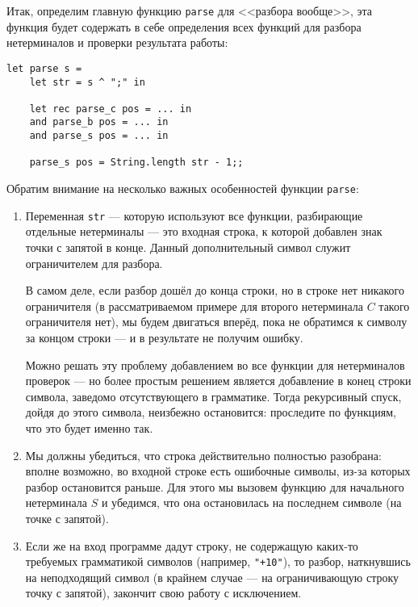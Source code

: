 \documentclass[12pt]{article}
\begin{document}
Итак, определим главную функцию \verb!parse! для <<разбора вообще>>, эта функция будет содержать 
в себе определения всех функций для разбора нетерминалов и проверки результата работы:

\begin{verbatim}
let parse s =
    let str = s ^ ";" in

    let rec parse_c pos = ... in
    and parse_b pos = ... in
    and parse_s pos = ... in

    parse_s pos = String.length str - 1;;
\end{verbatim}

Обратим внимание на несколько важных особенностей функции \verb!parse!:
\begin{enumerate}
\item Переменная \verb!str! --- которую используют все функции, разбирающие
отдельные нетерминалы --- это входная строка, к которой добавлен знак точки с
запятой в конце. Данный дополнительный символ служит ограничителем для разбора.

В самом деле, если разбор дошёл до конца строки, но в строке нет никакого ограничителя
(в рассматриваемом примере для второго нетерминала $C$ такого ограничителя нет), 
мы будем двигаться вперёд, пока не обратимся к символу за концом строки --- 
и в результате не получим ошибку.

Можно решать эту проблему добавлением во все функции для нетерминалов проверок 
--- но более простым решением является добавление в конец строки символа, заведомо
отсутствующего в грамматике. Тогда рекурсивный спуск, дойдя до этого символа,
неизбежно остановится: проследите по функциям, что это будет именно так.

\item Мы должны убедиться, что строка действительно полностью разобрана: вполне
возможно, во входной строке есть ошибочные символы, из-за которых разбор остановится
раньше. Для этого мы вызовем функцию для начального нетерминала $S$ и убедимся, что
она остановилась на последнем символе (на точке с запятой). 

\item Если же на вход программе дадут строку, не содержащую каких-то требуемых
грамматикой символов (например, \verb!"+10"!), то разбор, наткнувшись на неподходящий
символ (в крайнем случае --- на ограничивающую строку точку с запятой), закончит
свою работу с исключением.
\end{enumerate}

%
\end{document}

